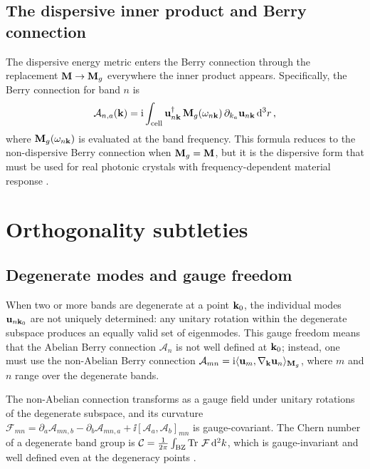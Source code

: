 \subsection{The dispersive inner product and Berry connection}
\label{sec:ch3-dispersive-berry}

The dispersive energy metric enters the Berry connection through the
replacement $\mathbf{M}\to\mathbf{M}_g$ everywhere the inner product appears.
Specifically, the Berry connection for band $n$ is
\begin{equation}\label{eq:ch3-dispersive-berry}
  \mathcal{A}_{n,a}(\mathbf{k})
  = \mathrm{i}\int_{\mathrm{cell}}
  \mathbf{u}_{n\mathbf{k}}^\dagger\,\mathbf{M}_g(\omega_{n\mathbf{k}})\,
  \partial_{k_a}\mathbf{u}_{n\mathbf{k}}\,\mathrm{d}^3 r\,,
\end{equation}
where $\mathbf{M}_g(\omega_{n\mathbf{k}})$ is evaluated at the band frequency.
This formula reduces to the non-dispersive Berry connection when
$\mathbf{M}_g=\mathbf{M}$, but it is the dispersive form that must be used for
real photonic crystals with frequency-dependent material response
\cite{gangaraj2016berry,ozawa2018topological}.

\section{Orthogonality subtleties}
\label{sec:ch3-orthogonality-subtleties}

\subsection{Degenerate modes and gauge freedom}
\label{sec:ch3-degenerate-gauge}

When two or more bands are degenerate at a point $\mathbf{k}_0$, the
individual modes $\mathbf{u}_{n\mathbf{k}_0}$ are not uniquely determined:
any unitary rotation within the degenerate subspace produces an
equally valid set of eigenmodes.  This gauge freedom means that the
Abelian Berry connection $\mathcal{A}_n$ is not well defined at
$\mathbf{k}_0$; instead, one must use the non-Abelian Berry connection
$\mathcal{A}_{mn}=\mathrm{i}\langle \mathbf{u}_m , \nabla_{\mathbf{k}}\mathbf{u}_n \rangle_{\mathbf{M}_g}$,
where $m$ and $n$ range over the degenerate bands.

The non-Abelian connection transforms as a gauge field under unitary
rotations of the degenerate subspace, and its curvature
$\mathcal{F}_{mn}=\partial_a\mathcal{A}_{mn,b}
-\partial_b\mathcal{A}_{mn,a}
+\ii[\mathcal{A}_a,\mathcal{A}_b]_{mn}$
is gauge-covariant.  The Chern number of a degenerate band group is
$\mathcal{C}=\frac{1}{2\pi}\int_{\mathrm{BZ}}\operatorname{Tr}\,\mathcal{F}\,\mathrm{d}^2 k$,
which is gauge-invariant and well defined even at the degeneracy
points \cite{gangaraj2016berry,ozawa2018topological}.

